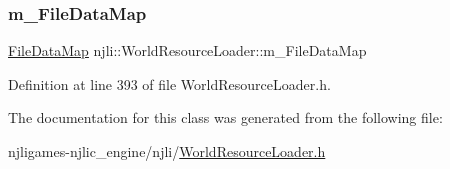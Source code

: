 \subsubsection{\texorpdfstring{m\+\_\+\+File\+Data\+Map}{m\_FileDataMap}}
{\footnotesize\ttfamily \mbox{\hyperlink{classnjli_1_1_world_resource_loader_a5a3b461a48cb2119251464a5e117533d}{File\+Data\+Map}} njli\+::\+World\+Resource\+Loader\+::m\+\_\+\+File\+Data\+Map\hspace{0.3cm}{\ttfamily [private]}}



Definition at line 393 of file World\+Resource\+Loader.\+h.



The documentation for this class was generated from the following file\+:\begin{DoxyCompactItemize}
\item 
njligames-\/njlic\+\_\+engine/njli/\mbox{\hyperlink{_world_resource_loader_8h}{World\+Resource\+Loader.\+h}}\end{DoxyCompactItemize}
